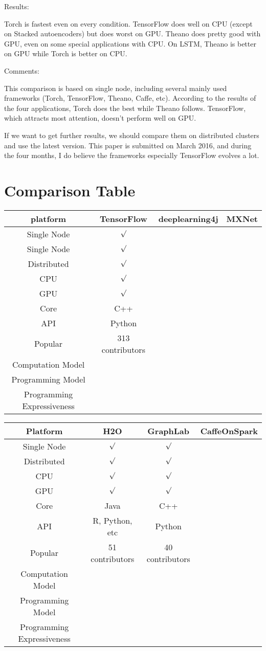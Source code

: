 \documentclass{article}
\begin{document}
Results:

Torch is fastest even on every condition. TensorFlow does well on CPU (except on Stacked autoencoders) but does worst on GPU. Theano does pretty good with GPU, even on some special applications with CPU. On LSTM, Theano is better on GPU while Torch is better on CPU.

Comments:

This comparison is based on single node, including several mainly used frameworks (Torch, TensorFlow, Theano, Caffe, etc). According to the results of the four applications, Torch does the best while Theano follows. TensorFlow, which attracts most attention, doesn't perform well on GPU.

If we want to get further results, we should compare them on distributed clusters and use the latest version. This paper is submitted on March 2016, and during the four months, I do believe the frameworks especially TensorFlow evolves a lot.
\section{Comparison Table}
\begin{tabular}{|c|c|c|c|}
\hline
platform & TensorFlow & deeplearning4j & MXNet \\
\hline
Single Node & ${\surd}$  &  &  \\
\hline
Single Node & ${\surd}$  &  &  \\
\hline
Distributed & ${\surd}$ &  &   \\
\hline
CPU & ${\surd}$ &  &  \\
\hline
GPU & ${\surd}$ &  &  \\
\hline
Core & C++ &  &  \\
\hline
API & Python &  &  \\
\hline
Popular & 313 contributors &  &  \\
\hline
Computation Model & &  \\
\hline
Programming Model & & \\
\hline
Programming Expressiveness & & \\
\hline
\end{tabular}

\begin{tabular}{|c|c|c|c|}
\hline
Platform & H2O & GraphLab & CaffeOnSpark \\
\hline
Single Node & ${\surd}$ & ${\surd}$ &  \\
\hline
Distributed & ${\surd}$ & ${\surd}$ &  \\
\hline
CPU & ${\surd}$ & ${\surd}$ &  \\
\hline
GPU & ${\surd}$ & ${\surd}$ &  \\
\hline
Core & Java & C++ &  \\
\hline
API & R, Python, etc & Python &  \\
\hline
Popular & 51 contributors & 40 contributors &  \\
\hline
Computation Model & &  \\
\hline
Programming Model & & \\
\hline
Programming Expressiveness & & \\
\hline
\end{tabular}
\end{document}
